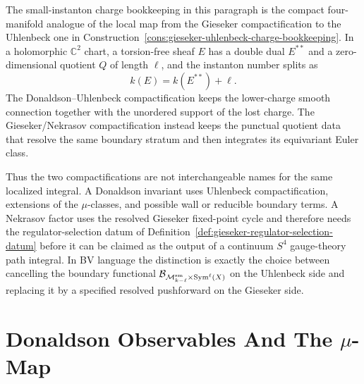 \begin{remark}
\label{rem:donaldson-uhlenbeck-gieseker-policy}
The small-instanton charge bookkeeping in this paragraph is the compact
four-manifold analogue of the local map from the Gieseker compactification to
the Uhlenbeck one in
Construction~\ref{cons:gieseker-uhlenbeck-charge-bookkeeping}.  In a
holomorphic \(\mathbb C^2\) chart, a torsion-free sheaf \(E\) has a double
dual \(E^{\ast\ast}\) and a zero-dimensional quotient \(Q\) of length
\(\ell\), and the instanton number splits as
\[
  k(E)=k(E^{\ast\ast})+\ell .
\]
The Donaldson--Uhlenbeck compactification keeps the lower-charge smooth
connection together with the unordered support of the lost charge.  The
Gieseker/Nekrasov compactification instead keeps the punctual quotient data
that resolve the same boundary stratum and then integrates its equivariant
Euler class.

Thus the two compactifications are not interchangeable names for the same
localized integral.  A Donaldson invariant uses Uhlenbeck compactification,
extensions of the \(\mu\)-classes, and possible wall or reducible boundary
terms.  A Nekrasov factor uses the resolved Gieseker fixed-point cycle and
therefore needs the regulator-selection datum of
Definition~\ref{def:gieseker-regulator-selection-datum} before it can be
claimed as the output of a continuum \(S^4\) gauge-theory path integral.  In
BV language the distinction is exactly the choice between cancelling the
boundary functional
\(\mathcal B_{\mathcal M_{k-\ell}^{\rm sm}\times{\rm Sym}^{\ell}(X)}\)
on the Uhlenbeck side and replacing it by a specified resolved pushforward on
the Gieseker side.
\end{remark}

\section{Donaldson Observables And The \texorpdfstring{\(\mu\)}{mu}-Map}

